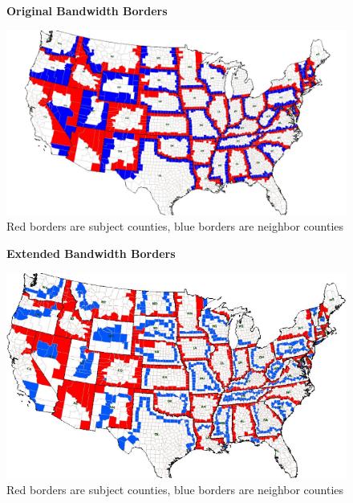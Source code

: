 \documentclass[12pt,a4paper]{article}
\begin{document}
\begin{figure}[h]\label{eb}
    \centering
    \textbf{Original Bandwidth Borders}\par\medskip
    \includegraphics[scale = 0.20]{../analysis/output/rb_picture}
    \caption{Red borders are subject counties, blue borders are neighbor counties}
\end{figure}

\begin{figure}[h]
    \centering
    \textbf{Extended Bandwidth Borders}\par\medskip
    \includegraphics[scale = 0.5]{../analysis/output/eb_picture}
    \caption{Red borders are subject counties, blue borders are neighbor counties}
\end{figure}


\end{document}

